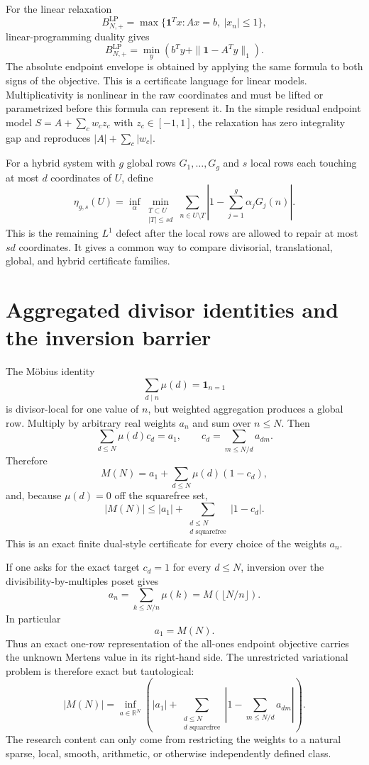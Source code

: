 \documentclass[11pt]{article}
\begin{document}
For the linear relaxation
\[
 B_{N,+}^{\mathrm{LP}}
 =\max\{\mathbf1^Tx:Ax=b,\ |x_n|\le1\},
\]
linear-programming duality gives
\[
 B_{N,+}^{\mathrm{LP}}
 =\min_y\left(b^Ty+\|\mathbf1-A^Ty\|_1\right).
\]
The absolute endpoint envelope is obtained by applying the same formula to both signs of the objective. This is a certificate language for linear models. Multiplicativity is nonlinear in the raw coordinates and must be lifted or parametrized before this formula can represent it. In the simple residual endpoint model $S=A+\sum_cw_cz_c$ with $z_c\in[-1,1]$, the relaxation has zero integrality gap and reproduces $|A|+\sum_c|w_c|$.

For a hybrid system with $g$ global rows $G_1,\ldots,G_g$ and $s$ local rows each touching at most $d$ coordinates of $U$, define
\[
 \eta_{g,s}(U)=
 \inf_{\alpha}
 \min_{\substack{T\subset U\\|T|\le sd}}
 \sum_{n\in U\setminus T}
 \left|1-\sum_{j=1}^g\alpha_jG_j(n)\right|.
\]
This is the remaining $L^1$ defect after the local rows are allowed to repair at most $sd$ coordinates. It gives a common way to compare divisorial, translational, global, and hybrid certificate families.

\section{Aggregated divisor identities and the inversion barrier}
The Möbius identity
\[
 \sum_{d\mid n}\mu(d)=\mathbf1_{n=1}
\]
is divisor-local for one value of $n$, but weighted aggregation produces a global row. Multiply by arbitrary real weights $a_n$ and sum over $n\le N$. Then
\[
 \sum_{d\le N}\mu(d)c_d=a_1,
 \qquad
 c_d=\sum_{m\le N/d}a_{dm}.
\]
Therefore
\[
 M(N)
 =a_1+\sum_{d\le N}\mu(d)(1-c_d),
\]
and, because $\mu(d)=0$ off the squarefree set,
\[
 |M(N)|
 \le |a_1|+
 \sum_{\substack{d\le N\\d\text{ squarefree}}}
 |1-c_d|.
\]
This is an exact finite dual-style certificate for every choice of the weights $a_n$.

If one asks for the exact target $c_d=1$ for every $d\le N$, inversion over the divisibility-by-multiples poset gives
\[
 a_n=\sum_{k\le N/n}\mu(k)
 =M(\lfloor N/n\rfloor).
\]
In particular
\[
 a_1=M(N).
\]
Thus an exact one-row representation of the all-ones endpoint objective carries the unknown Mertens value in its right-hand side. The unrestricted variational problem is therefore exact but tautological:
\[
 |M(N)|=
 \inf_{a\in\mathbb R^N}
 \left(
 |a_1|+
 \sum_{\substack{d\le N\\d\text{ squarefree}}}
 \left|1-\sum_{m\le N/d}a_{dm}\right|
 \right).
\]
The research content can only come from restricting the weights to a natural sparse, local, smooth, arithmetic, or otherwise independently defined class.
\end{document}
